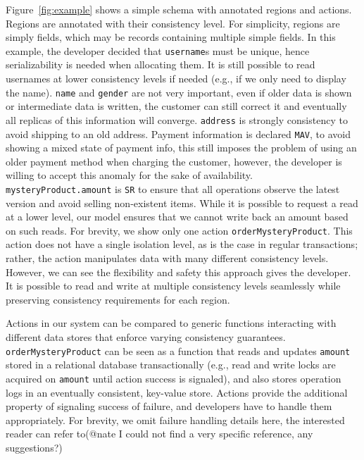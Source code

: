 \documentclass[preprint,numbers]{sigplanconf}
\begin{document}
Figure~\ref{fig:example} shows a simple schema with annotated
regions and actions. Regions are annotated 
with their consistency level. For simplicity, regions are simply fields,
which may be records containing multiple simple fields.
In this example, the developer decided that \texttt{username}s must be 
unique, hence serializability is needed
when allocating them. It is still possible to read usernames at lower
consistency levels if needed (e.g., if we only need to display the name). 
\texttt{name} and \texttt{gender} are not very important, even if older
data is shown or intermediate data is written, the customer can still correct
it and eventually all replicas of this information will converge.
\texttt{address} is strongly consistency to avoid shipping to an old address.
Payment information is declared \texttt{MAV}, to avoid showing a mixed state of payment info, this still
imposes the problem of using an older payment method when charging the customer,
however, the developer is willing to accept this anomaly for the sake of
availability. \texttt{mysteryProduct.amount} is \texttt{SR} to ensure that all operations
observe the latest version and avoid selling non-existent items. While it is possible to request a read at a lower
level, our model ensures that we cannot write back an amount based on such reads. For brevity,
we show only one action \texttt{orderMysteryProduct}. This action does
not have a single isolation level, as is the case in regular transactions;
rather, the action manipulates data with many different consistency levels.
However, we can see the flexibility and safety this approach gives the
developer. It is possible to read and write at multiple consistency levels
seamlessly while preserving  consistency requirements for each region.

Actions in our system can be compared to generic functions interacting
with different data stores that enforce varying consistency guarantees.
\texttt{orderMysteryProduct} can be seen as a function that
reads and updates \texttt{amount} stored in a relational database
transactionally (e.g., read and write locks are acquired on \texttt{amount} until
action success is signaled), and also stores operation logs in an eventually consistent,
key-value store. Actions provide the additional property of signaling success
of failure, and developers have to handle them appropriately. For brevity, we
omit failure handling details here, the interested reader can refer to(@nate I
could not find a very specific reference, any suggestions?)
\end{document}
